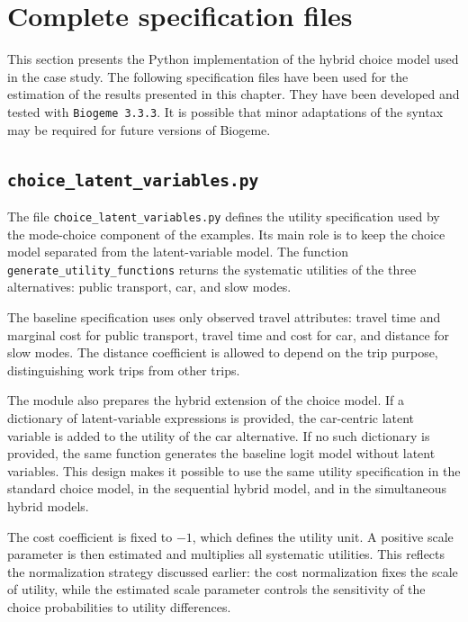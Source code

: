 \documentclass[12pt,a4paper]{article}
\begin{document}
\clearpage
\section{Complete specification files}
\label{sec:specification_files}
This section presents the Python implementation of the hybrid choice
model used in the case study. The following specification files have
been used for the estimation of the results presented in this chapter.
They have been developed and tested with \texttt{Biogeme~3.3.3}. It is
possible that minor adaptations of the syntax may be required for
future versions of Biogeme.

\subsection{\lstinline$choice_latent_variables.py$}
\label{sec:choice_latent_variables.py}


The file \lstinline$choice_latent_variables.py$ defines the utility
specification used by the mode-choice component of the examples. Its
main role is to keep the choice model separated from the
latent-variable model. The function
\lstinline$generate_utility_functions$ returns the systematic
utilities of the three alternatives: public transport, car, and slow
modes.

The baseline specification uses only observed travel attributes:
travel time and marginal cost for public transport, travel time and
cost for car, and distance for slow modes. The distance coefficient is
allowed to depend on the trip purpose, distinguishing work trips from
other trips.

The module also prepares the hybrid extension of the choice model. If
a dictionary of latent-variable expressions is provided, the
car-centric latent variable is added to the utility of the car
alternative. If no such dictionary is provided, the same function
generates the baseline logit model without latent variables. This
design makes it possible to use the same utility specification in the
standard choice model, in the sequential hybrid model, and in the
simultaneous hybrid models.

The cost coefficient is fixed to \(-1\), which defines the utility
unit. A positive scale parameter is then estimated and multiplies all
systematic utilities. This reflects the normalization strategy
discussed earlier: the cost normalization fixes the scale of utility,
while the estimated scale parameter controls the sensitivity of the
choice probabilities to utility differences.
\end{document}
